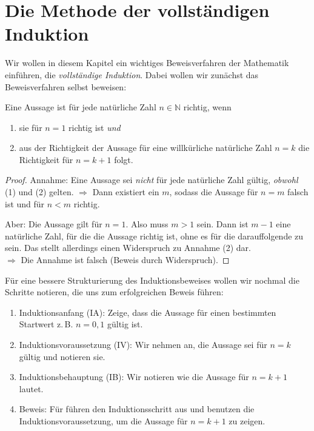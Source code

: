 \section{Die Methode der vollständigen Induktion}

Wir wollen in diesem Kapitel ein wichtiges Beweisverfahren der Mathematik einführen, die \emph{vollständige Induktion}. Dabei wollen wir zunächst das Beweisverfahren selbst beweisen:

\begin{satz}
    Eine Aussage ist für jede natürliche Zahl $n \in \mathbb{N}$ richtig, wenn 
    \begin{enumerate}
        \item sie für $n=1$ richtig ist \emph{und}
        \item aus der Richtigkeit der Aussage für eine willkürliche natürliche Zahl $n=k$ die Richtigkeit für $n=k+1$ folgt.
    \end{enumerate}
\end{satz}

\begin{proof}
    Annahme: Eine Aussage sei \emph{nicht} für jede natürliche Zahl gültig, \emph{obwohl} (1) und (2) gelten. $\Rightarrow$ Dann existiert ein $m$, sodass die Aussage für $n=m$ falsch ist und für $n < m$ richtig. 

    Aber: Die Aussage gilt für $n=1$. Also muss $m > 1$ sein. Dann ist $m-1$ eine natürliche Zahl, für die die Aussage richtig ist, ohne es für die darauffolgende zu sein. Das stellt allerdings einen Widerspruch zu Annahme (2) dar. \\
    $\Longrightarrow$ Die Annahme ist falsch (Beweis durch Widerspruch).
\end{proof}

Für eine bessere Strukturierung des Induktionsbeweises wollen wir nochmal die Schritte notieren, die uns zum erfolgreichen Beweis führen:
\begin{enumerate}
    \item Induktionsanfang (IA): Zeige, dass die Aussage für einen bestimmten Startwert z.\,B. $n=0,1$ gültig ist.
    \item Induktionsvoraussetzung (IV): Wir nehmen an, die Aussage sei für $n=k$ gültig und notieren sie. 
    \item Induktionsbehauptung (IB): Wir notieren wie die Aussage für $n=k+1$ lautet. 
    \item Beweis: Für führen den Induktionsschritt aus und benutzen die Induktionsvoraussetzung, um die Aussage für $n=k+1$ zu zeigen.
\end{enumerate}

